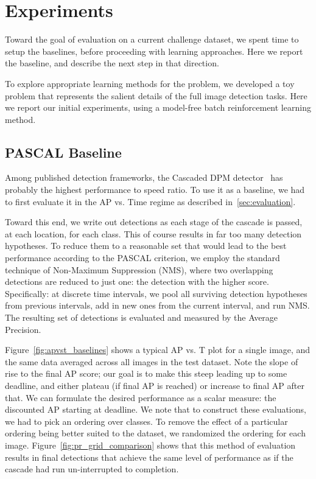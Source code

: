 \section{Experiments} \label{sec:experiments}

Toward the goal of evaluation on a current challenge dataset, we spent time to setup the baselines, before proceeding with learning approaches.
Here we report the baseline, and describe the next step in that direction.

To explore appropriate learning methods for the problem, we developed a toy problem that represents the salient details of the full image detection tasks.
Here we report our initial experiments, using a model-free batch reinforcement learning method.

\subsection{PASCAL Baseline}
Among published detection frameworks, the Cascaded DPM detector~\cite{Felzenszwalb2010b} has probably the highest performance to speed ratio.
To use it as a baseline, we had to first evaluate it in the AP vs. Time regime as described in~\autoref{sec:evaluation}.

Toward this end, we write out detections as each stage of the cascade is passed, at each location, for each class.
This of course results in far too many detection hypotheses.
To reduce them to a reasonable set that would lead to the best performance according to the PASCAL criterion, we employ the standard technique of Non-Maximum Suppression (NMS), where two overlapping detections are reduced to just one: the detection with the higher score.
Specifically: at discrete time intervals, we pool all surviving detection hypotheses from previous intervals, add in new ones from the current interval, and run NMS.
The resulting set of detections is evaluated and measured by the Average Precision.





Figure~\ref{fig:apvst_baselines} shows a typical AP vs. T plot for a single image, and the same data averaged across all images in the test dataset.
Note the slope of rise to the final AP score; our goal is to make this steep leading up to some deadline, and either plateau (if final AP is reached) or increase to final AP after that.
We can formulate the desired performance as a scalar measure: the discounted AP starting at deadline.
We note that to construct these evaluations, we had to pick an ordering over classes.
To remove the effect of a particular ordering being better suited to the dataset, we randomized the ordering for each image.
Figure~\ref{fig:pr_grid_comparison} shows that this method of evaluation results in final detections that achieve the same level of performance as if the cascade had run un-interrupted to completion.

